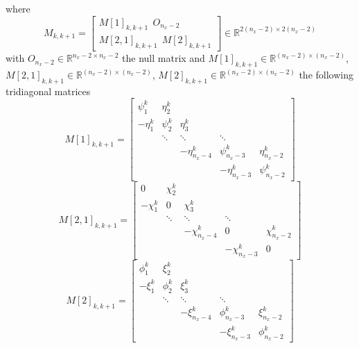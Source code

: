 \documentclass[smallcondensed]{svjour3}
\begin{document}
where 
\begin{equation}
M_{k,k+1}=\left[\begin{array}{lllllllllllll}
M[1]_{k,k+1} \ \ O_{n_{x}-2}\\
M[2,1]_{k,k+1} \ \ M[2]_{k,k+1}
\end{array}\right] \in \mathbb{R}^{2(n_{x}-2)\times 2(n_{x}-2)} 
\end{equation}
with $O_{n_{x}-2}\in \mathbb{R}^{n_{x}-2\times n_{x}-2}$ the null matrix and $M[1]_{k,k+1}\in \mathbb{R}^{(n_{x}-2)\times (n_{x}-2)}$, $M[2,1]_{k,k+1}\in \mathbb{R}^{(n_{x}-2)\times (n_{x}-2)}$, $M[2]_{k,k+1}\in \mathbb{R}^{(n_{x}-2)\times (n_{x}-2)}$ the following tridiagonal matrices 
{\footnotesize
\begin{equation}\label{section7M}
M[1]_{k,k+1}=\left[\begin{array}{lllllllllllll}
\psi_{1}^{k} & \eta_{2}^{k} & & & \\
-\eta_{1}^{k}& \psi_{2}^{k}  &  \eta_{3}^{k} & &  \\
& \ddots & \ddots & \ddots   \\
& &-\eta_{n_{x}-4}^{k} & \psi_{n_{x}-3}^{k}  &\eta_{n_{x}-2}^{k}  \\
& &  &-\eta_{n_{x}-3 }^{k} & \psi_{n_{x}-2}^{k}
\end{array}\right]
\end{equation}
\begin{equation}
M[2,1]_{k,k+1}=\left[\begin{array}{lllllllllllll}
0 & \chi_{2}^{k}& & & \\
-\chi_{1}^{k}& 0 &  \chi_{3}^{k} & & \\
& \ddots & \ddots & \ddots   \\
& &-\chi_{n_{x}-4}^{k} & 0  &\chi_{n_{x}-2}^{k}  \\
& &  &-\chi_{n_{x}-3 }^{k}  & 0
\end{array}\right]
\end{equation}
\begin{equation}
M[2]_{k,k+1}=\left[\begin{array}{lllllllllllll}
\phi_{1}^{k} & \xi_{2}^{k}& & & \\
-\xi_{1}^{k}& \phi_{2}^{k} & \xi_{3}^{k} & & \\
& \ddots & \ddots & \ddots   \\
& &-\xi_{n_{x}-4}^{k} & \phi_{n_{x}-3}^{k}  &\xi_{n_{x}-2}^{k}  \\
& &  &-\xi_{n_{x}-3}^{k}  & \phi_{n_{x}-2}^{k}
\end{array}\right]
\end{equation}
}
\end{document}
